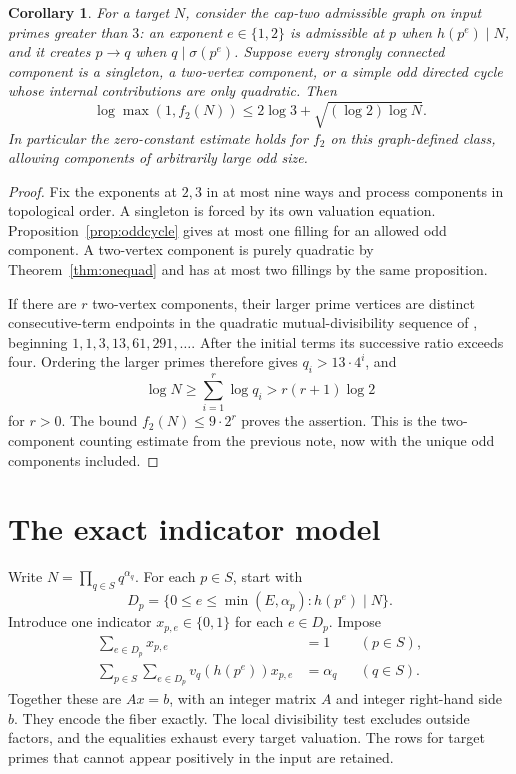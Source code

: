 \documentclass[11pt]{article}
\newtheorem{corollary}[theorem]{Corollary}
\begin{document}
\begin{corollary}\label{cor:graphclass}
For a target $N$, consider the cap-two admissible graph on input primes greater than $3$: an exponent $e\in\{1,2\}$ is admissible at $p$ when $h(p^e)\mid N$, and it creates $p\to q$ when $q\mid\sigma(p^e)$. Suppose every strongly connected component is a singleton, a two-vertex component, or a simple odd directed cycle whose internal contributions are only quadratic. Then
\[
 \log\max(1,f_2(N))\le 2\log3+\sqrt{(\log2)\log N}.
\]
In particular the zero-constant estimate holds for $f_2$ on this graph-defined class, allowing components of arbitrarily large odd size.
\end{corollary}
\begin{proof}
Fix the exponents at $2,3$ in at most nine ways and process components in topological order. A singleton is forced by its own valuation equation. Proposition~\ref{prop:oddcycle} gives at most one filling for an allowed odd component. A two-vertex component is purely quadratic by Theorem~\ref{thm:onequad} and has at most two fillings by the same proposition.

If there are $r$ two-vertex components, their larger prime vertices are distinct consecutive-term endpoints in the quadratic mutual-divisibility sequence of \cite[Lemma 5]{bibby}, beginning $1,1,3,13,61,291,\ldots$. After the initial terms its successive ratio exceeds four. Ordering the larger primes therefore gives $q_i>13\cdot4^i$, and
\[
 \log N\ge\sum_{i=1}^r\log q_i>r(r+1)\log2
\]
for $r>0$. The bound $f_2(N)\le9\cdot2^r$ proves the assertion. This is the two-component counting estimate from the previous note, now with the unique odd components included.
\end{proof}

\section{The exact indicator model}
Write $N=\prod_{q\in S}q^{\alpha_q}$. For each $p\in S$, start with
\[
 D_p=\{0\le e\le\min(E,\alpha_p):h(p^e)\mid N\}.
\]
Introduce one indicator $x_{p,e}\in\{0,1\}$ for each $e\in D_p$. Impose
\begin{align}
 \sum_{e\in D_p}x_{p,e}&=1 &&(p\in S),\label{eq:onehot}\\
 \sum_{p\in S}\sum_{e\in D_p}v_q(h(p^e))x_{p,e}&=\alpha_q &&(q\in S).\label{eq:valuation}
\end{align}
Together these are $Ax=b$, with an integer matrix $A$ and integer right-hand side $b$. They encode the fiber exactly. The local divisibility test excludes outside factors, and the equalities exhaust every target valuation. The rows for target primes that cannot appear positively in the input are retained.
\end{document}
